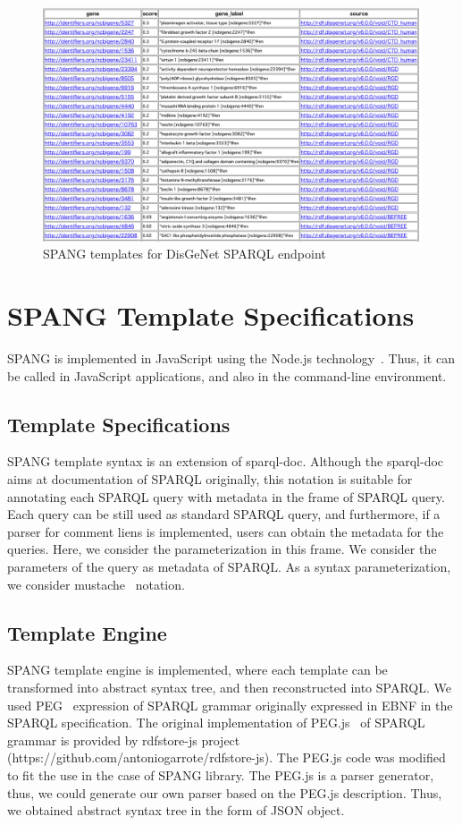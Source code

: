 \documentclass[runningheads]{llncs}
\begin{document}
\begin{figure}
\center
\includegraphics[width=1.0\textwidth]{spang_disease_gene_result.png}
\caption{SPANG templates for DisGeNet SPARQL endpoint}
\label{fig:spang_disease_gene_result}
\end{figure}





\section{SPANG Template Specifications}

SPANG is implemented in JavaScript using the Node.js technology~\cite{nodejs}. Thus, it can be called in JavaScript applications, and also in the command-line environment.

\subsection{Template Specifications}
SPANG template syntax is an extension of sparql-doc. Although the sparql-doc aims at documentation of SPARQL originally, this notation is suitable for annotating each SPARQL query with metadata in the frame of SPARQL query. Each query can be still used as standard SPARQL query, and furthermore, if a parser for comment liens is implemented, users can obtain the metadata for the queries.
Here, we consider the parameterization in this frame. We consider the parameters of the query as metadata of SPARQL.
As a syntax parameterization, we consider mustache~\cite{mustache} notation.


\subsection{Template Engine}
SPANG template engine is implemented, where each template can be transformed into abstract syntax tree, and then reconstructed into SPARQL. 
We used PEG~\cite{peg} expression of SPARQL grammar originally expressed in EBNF in the SPARQL specification. The original implementation of PEG.js~\cite{pegjs} of SPARQL grammar is provided by rdfstore-js project (https://github.com/antoniogarrote/rdfstore-js).
The PEG.js code was modified to fit the use in the case of SPANG library.
The PEG.js is a parser generator, thus, we could generate our own parser based on the PEG.js description. Thus, we obtained abstract syntax tree in the form of JSON object.
\end{document}
